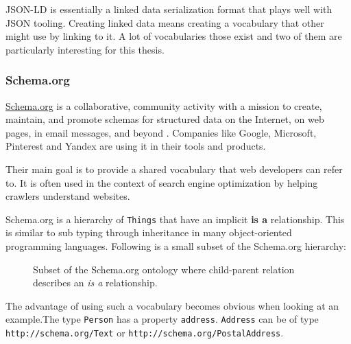 JSON-LD is essentially a linked data serialization format that plays well with JSON tooling. Creating linked data means creating a vocabulary that other might use by linking to it. A lot of vocabularies those exist and two of them are particularly interesting for this thesis.

\subsubsection{Schema.org}

\url{Schema.org} is a collaborative, community activity with a mission to create, maintain, and promote schemas for structured data on the Internet, on web pages, in email messages, and beyond \citep{welcomeschemaorg}. Companies like Google, Microsoft, Pinterest and Yandex are using it in their tools and products.

Their main goal is to provide a shared vocabulary that web developers can refer to. It is often used in the context of search engine optimization by helping crawlers understand websites.

Schema.org is a hierarchy of \lstinline{Things} that have an implicit \textbf{is a} relationship. This is similar to sub typing through inheritance in many object-oriented programming languages. Following is a small subset of the Schema.org hierarchy:

\begin{figure}[!htb]
  \caption{\label{fig:schemaorg} Subset of the Schema.org ontology where child-parent relation describes an \textit{is a} relationship.}
\end{figure}

The advantage of using such a vocabulary becomes obvious when looking at an example.The type \lstinline{Person} has a property \lstinline{address}. \lstinline{Address} can be of type \lstinline{http://schema.org/Text} or \lstinline{http://schema.org/PostalAddress}.


